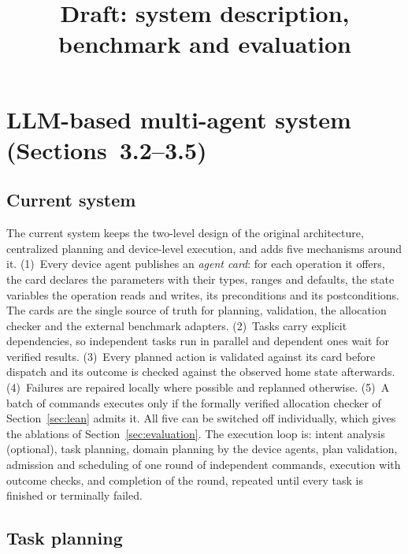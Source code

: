 \documentclass[a4paper,11pt]{article}
\begin{document}
\title{Draft: system description, benchmark and evaluation}
\date{}
\maketitle

\section{LLM-based multi-agent system (Sections~3.2--3.5)}

\subsection{Current system}
\label{sec:current-system}

The current system keeps the two-level design of the original architecture, centralized planning
and device-level execution, and adds five mechanisms around it. (1)~Every device agent publishes
an \emph{agent card}: for each operation it offers, the card declares the parameters with their
types, ranges and defaults, the state variables the operation reads and writes, its preconditions
and its postconditions. The cards are the single source of truth for planning, validation, the
allocation checker and the external benchmark adapters. (2)~Tasks carry explicit dependencies, so
independent tasks run in parallel and dependent ones wait for verified results. (3)~Every planned
action is validated against its card before dispatch and its outcome is checked against the
observed home state afterwards. (4)~Failures are repaired locally where possible and replanned
otherwise. (5)~A batch of commands executes only if the formally verified allocation checker of
Section~\ref{sec:lean} admits it. All five can be switched off individually, which gives the
ablations of Section~\ref{sec:evaluation}. The execution loop is: intent analysis (optional),
task planning, domain planning by the device agents, plan validation, admission and scheduling of
one round of independent commands, execution with outcome checks, and completion of the round,
repeated until every task is finished or terminally failed.

\subsection{Task planning}
\label{sec:task-planning}
\end{document}
